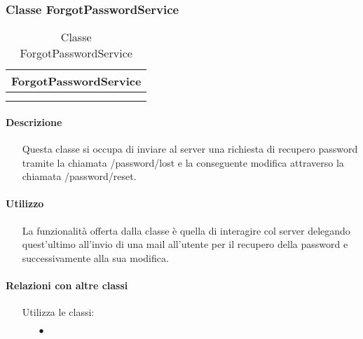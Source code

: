 \subsubsection{Classe ForgotPasswordService}

\begin{table}[H]
\begin{center}
\bgroup
\setlength{\arrayrulewidth}{0.6mm}
\def\arraystretch{1}
\begin{tabular}{ | p{12cm} | }
\hline
\centerline{\textbf{ForgotPasswordService}}
\\ \hline
 \\ 
\hline
 \\ 
\hline
\end{tabular}
\egroup
\caption{Classe ForgotPasswordService}
\end{center}
\end{table}

\paragraph*{Descrizione}
\begin{itemize}
\item[] Questa classe si occupa di inviare al server una richiesta di recupero password tramite la chiamata /password/lost e la conseguente modifica attraverso la chiamata /password/reset.
\end{itemize}

\paragraph*{Utilizzo}
\begin{itemize}
\item[] La  funzionalità offerta dalla classe è quella di interagire col server delegando quest'ultimo all'invio di una mail all'utente per il recupero della password e successivamente alla sua modifica.
\end{itemize}

\paragraph*{Relazioni con altre classi}
\begin{itemize}


\item[] Utilizza le classi:
\begin{itemize}
\item[$\bullet$] 
\end{itemize}
\end{itemize}

